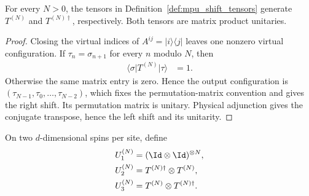 \begin{lemma}
    \label{thm:mpu_shift_tensor_formulas}
    \leanok
    For every $N>0$, the tensors in Definition~\ref{def:mpu_shift_tensors}
    generate $T^{(N)}$ and $T^{(N)\dagger}$, respectively.  Both tensors are
    matrix product unitaries.
\end{lemma}

\begin{proof}\leanok
    Closing the virtual indices of $A^{ij}=\lvert i\rangle\langle j\rvert$
    leaves one nonzero virtual configuration.  If
    $\tau_n=\sigma_{n+1}$ for every $n$ modulo $N$, then
    \begin{align}
        \langle\sigma\vert T^{(N)}\vert\tau\rangle & =1.
    \end{align}
    Otherwise the same matrix entry is zero.  Hence the output configuration is
    $(\tau_{N-1},\tau_0,\ldots,\tau_{N-2})$, which fixes the permutation-matrix
    convention and gives the right shift.  Its permutation matrix is unitary.
    Physical adjunction gives the conjugate transpose, hence the left shift and
    its unitarity.
\end{proof}

\begin{definition}
    \label{threeMPU}
    \leanok
    On two $d$-dimensional spins per site, define
    \begin{align}
        U_1^{(N)} & =(\Id\otimes\Id)^{\otimes N},   \\
        U_2^{(N)} & =T^{(N)\dagger}\otimes T^{(N)}, \\
        U_3^{(N)} & =T^{(N)}\otimes T^{(N)\dagger}.
    \end{align}
\end{definition}

